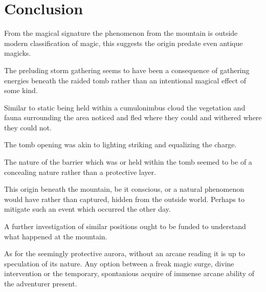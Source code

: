 \documentclass{article}
\begin{document}
    \section*{Conclusion}

    From the magical signature the phenomenon from the mountain is outside modern classification of magic, this suggests the origin predate even antique magicks. 

    The preluding storm gathering seems to have been a consequence of gathering energies beneath the raided tomb rather than an intentional magical effect of some kind.

    Similar to static being held within a cumulonimbus cloud the vegetation and fauna surrounding the area noticed and fled where they could and withered where they could not.

    The tomb opening was akin to lighting striking and equalizing the charge. 

    The nature of the barrier which was or held within the tomb seemed to be of a concealing nature rather than a protective layer. 

    This origin beneath the mountain, be it conscious, or a natural phenomenon would have rather than captured, hidden from the outside world. Perhaps to mitigate such an event which occurred the other day. 

    A further investigation of similar positions ought to be funded to understand what happened at the mountain.

    As for the seemingly protective aurora, without an arcane reading it is up to speculation of its nature. Any option between a freak magic surge, divine intervention or the temporary, spontanious acquire of immense arcane ability of the adventurer present.


    
    
\end{document}
